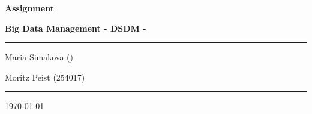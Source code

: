 \documentclass[12pt]{article}
\begin{document}
\begin{titlepage}
	\centering
	\par\vspace{0.75cm}
	{\huge\bfseries Assignment~\nass\par}
    {\large\bfseries Big Data Management - DSDM -~\gr\par}
	\vspace{0.25cm}
    \noindent\rule{\textwidth}{1pt}
    {\Large Maria Simakova ()\par}
	{\Large Moritz Peist (254017)\par}
    \noindent\rule{\textwidth}{1pt}
	\vfill
    \tableofcontents
    \vfill
	{\large \today\par}
\end{titlepage}



\newpage

\end{document}
